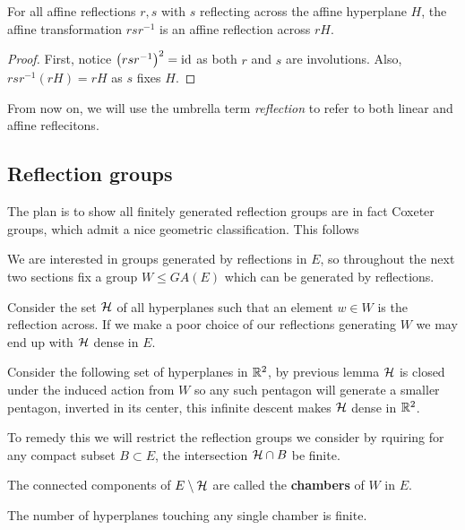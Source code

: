 \documentclass[../main.tex]{subfiles}
\begin{document}
\begin{proposition}
    For all affine reflections $r,s$ with $s$ reflecting across the affine hyperplane $H$, the affine transformation $rsr^{-1}$ is an affine reflection across $rH$.
    \begin{proof}
        First, notice $\left( rsr^{-1} \right)^2 = \text{id}$ as both $r$ and $s$ are involutions. Also, $rsr^{-1}(rH) = rH$ as $s$ fixes $H$.
    \end{proof}
\end{proposition}

From now on, we will use the umbrella term \textit{reflection} to refer to both linear and affine reflecitons.

\subsection{Reflection groups}

The plan is to show all finitely generated reflection groups are in fact Coxeter groups, which admit a nice geometric classification. This follows \cite{Humphreys1990}

We are interested in groups generated by reflections in $E$, so throughout the next two sections fix a group $W\leq GA(E)$ which can be generated by reflections.

Consider the set $\mathcal{H}$ of all hyperplanes such that an element $w\in W$ is the reflection across. If we make a poor choice of our reflections generating $W$ we may end up with $\mathcal{H}$ dense in $E$.

\begin{example}
    Consider the following set of hyperplanes in $\mathbb{R}^2$, by previous lemma $\mathcal{H}$ is closed under the induced action from $W$ so any such pentagon will generate a smaller pentagon, inverted in its center, this infinite descent makes $\mathcal{H}$ dense in $\mathbb{R}^2$.
\end{example}

To remedy this we will restrict the reflection groups we consider by rquiring for any compact subset $B\subset E$, the intersection $\mathcal{H}\cap B$ be finite.

\begin{definition}
    The connected components of $E\setminus \mathcal{H}$ are called the \textbf{chambers} of $W$ in $E$.
\end{definition}

\begin{proposition}
    The number of hyperplanes touching any single chamber is finite.
\end{proposition}
\end{document}

